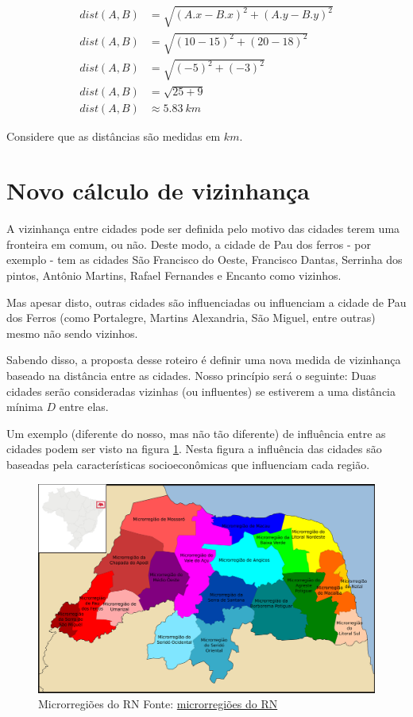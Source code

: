 \documentclass[12pt,a4paper]{article}
\begin{document}
\begin{align}
    dist(A,B) &= \sqrt{(A.x - B.x)^2 + (A.y - B.y)^2}\\
    dist(A,B) &= \sqrt{(10 - 15)^2 + (20 - 18)^2}\\
    dist(A,B) &= \sqrt{(-5)^2 + (-3)^2}\\
    dist(A,B) &= \sqrt{25 + 9}\\
    dist(A,B) &\approx 5.83\ km
\end{align}

Considere que as distâncias são medidas em $km$.

\section*{Novo cálculo de vizinhança}

A vizinhança entre cidades pode ser definida pelo motivo das cidades terem uma fronteira em comum, ou não. Deste modo, a cidade de Pau dos ferros - por exemplo - tem as cidades São Francisco do Oeste, Francisco Dantas, Serrinha dos pintos, Antônio Martins, Rafael Fernandes e Encanto como vizinhos.

Mas apesar disto, outras cidades são influenciadas ou influenciam a cidade de Pau dos Ferros (como Portalegre, Martins Alexandria, São Miguel, entre outras) mesmo não sendo vizinhos.

Sabendo disso, a proposta desse roteiro é definir uma nova medida de vizinhança baseado na distância entre as cidades. Nosso princípio será o seguinte: Duas cidades serão consideradas vizinhas (ou influentes) se estiverem a uma distância mínima $D$ entre elas.

Um exemplo (diferente do nosso, mas não tão diferente) de influência entre as cidades podem ser visto na figura \ref{fig:fig1}. Nesta figura a influência das cidades são baseadas pela características socioeconômicas que influenciam cada região.

\begin{figure}[H]
    \centering
    \includegraphics[width=\linewidth]{altoOeste.jpeg}
    \caption{Microrregiões do RN Fonte: \href{https://pt.wikipedia.org/wiki/lista_de_mesorregi\%C3\%B5es_e_microrregi\%C3\%B5es_do_Rio_Grande_do_Norte}{microrregiões do RN}} 
    \label{fig:fig1}
\end{figure}
\end{document}
